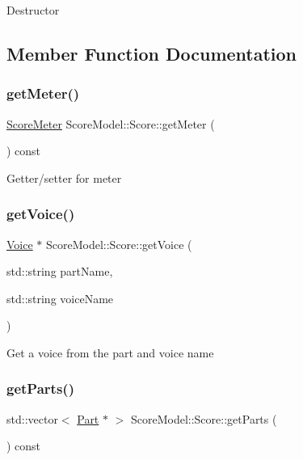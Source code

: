 Destructor 

\subsection{Member Function Documentation}
\mbox{\label{classScoreModel_1_1Score_a593a14d9b5a926a4784c75c62780092b}} 
\subsubsection{\texorpdfstring{getMeter()}{getMeter()}}
{\footnotesize\ttfamily \mbox{\hyperlink{classScoreModel_1_1ScoreMeter}{Score\+Meter}} Score\+Model\+::\+Score\+::get\+Meter (\begin{DoxyParamCaption}{ }\end{DoxyParamCaption}) const}

Getter/setter for meter \mbox{\label{classScoreModel_1_1Score_ac5c2af8ebfc77176d9f2c4306a4d04cb}} 
\subsubsection{\texorpdfstring{getVoice()}{getVoice()}}
{\footnotesize\ttfamily \mbox{\hyperlink{classScoreModel_1_1Voice}{Voice}} $\ast$ Score\+Model\+::\+Score\+::get\+Voice (\begin{DoxyParamCaption}\item[{std\+::string}]{part\+Name,  }\item[{std\+::string}]{voice\+Name }\end{DoxyParamCaption})}

Get a voice from the part and voice name \mbox{\label{classScoreModel_1_1Score_a1bbc42654c49e6ac2273d38cca19c5e6}} 
\subsubsection{\texorpdfstring{getParts()}{getParts()}}
{\footnotesize\ttfamily std\+::vector$<$ \mbox{\hyperlink{classScoreModel_1_1Part}{Part}} $\ast$ $>$ Score\+Model\+::\+Score\+::get\+Parts (\begin{DoxyParamCaption}{ }\end{DoxyParamCaption}) const}

